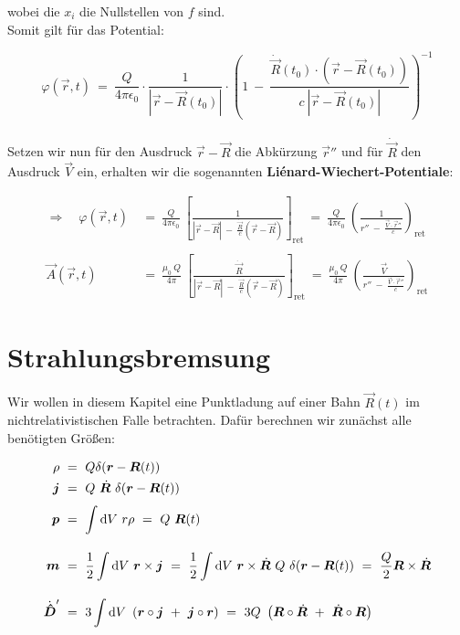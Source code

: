 wobei die $x_i$ die Nullstellen von $f$ sind.\\
Somit gilt für das Potential:

\begin{equation*}
\varphi(\vec{r},t)  \ = \ \frac{Q}{4\pi\epsilon_0}\cdot \frac{1}{|\vec{r}-\vec{R}(t_0)|} \cdot \left(1\ - \ \frac{\dot{\vec{R}}(t_0) \cdot (\vec{r}-\vec{R}(t_0))}{c \ |\vec{r}-\vec{R}(t_0)|}\right)^{-1}
\end{equation*}\\

Setzen wir nun für den Ausdruck $\vec{r}-\vec{R}$ die Abkürzung $\vec{r}''$ und für $\dot{\vec{R}}$ den Ausdruck $\vec{V}$ ein, erhalten wir die sogenannten \textbf{Liénard-Wiechert-Potentiale}:

\begin{align*}
\Rightarrow \quad \varphi(\vec{r},t)  \ &= \ \frac{Q}{4\pi\epsilon_0} \ \left[\frac{1}{|\vec{r}-\vec{R}| \ - \ \frac{\dot{\vec{R}}}{c} (\vec{r}-\vec{R})}\right]_{\text{ret}}  \ = \ \frac{Q}{4\pi\epsilon_0} \ \left(\frac{1}{r'' \ - \ \frac{ \vec{V}\cdot \vec{r}''}{c}}\right)_{\text{ret}}\\
\ \\
\vec{A}(\vec{r},t) \ &= \ \frac{\mu_0 \ Q}{4\pi} \ \left[\frac{\dot{\vec{R}}}{|\vec{r}-\vec{R}| \ - \ \frac{\dot{\vec{R}}}{c}(\vec{r}-\vec{R})}\right]_{\text{ret}}  \ = \  \frac{\mu_0 \ Q}{4\pi} \ \left(\frac{\vec{V}}{r'' \ - \ \frac{\vec{V}\cdot\vec{r}''}{c}}\right)_{\text{ret}} 
\end{align*}	

\newpage
\section{Strahlungsbremsung}

Wir wollen in diesem Kapitel eine Punktladung auf einer Bahn 
$\vec{R}(t)$ im nichtrelativistischen Falle betrachten. Dafür berechnen wir zunächst alle benötigten Größen:

\begin{align*}
\rho  \ &= \ Q \delta(\vec{r}-\vec{R}(t))\\
\vec{j}  \ &= \ Q \  \dot{\vec{R}} \ \delta(\vec{r}-\vec{R}(t))\\
\vec{p} \ &= \ \Int{}{}{V}r\rho  \ = \  Q \ \vec{R}(t)\\
\vec{m}  \ &= \ \frac{1}{2} \Int{}{}{V} \vec{r}\times\vec{j}  \ = \ \frac{1}{2}\Int{}{}{V}\vec{r}\times\dot{\vec{R}}\ Q \ \delta(\vec{r}-\vec{R}(t)) \ = \ \frac{Q}{2} \vec{R}\times\dot{\vec{R}}\\
\dot{\tens{D}}'  \ &= \ 3 \Int{}{}{V} \left(\vec{r}\circ\vec{j} \ + \ \vec{j}\circ\vec{r}\right)  \ = \ 3Q \ \left(\vec{R}\circ\dot{\vec{R}} \ + \ \dot{\vec{R}}\circ\vec{R}\right)
\end{align*}


